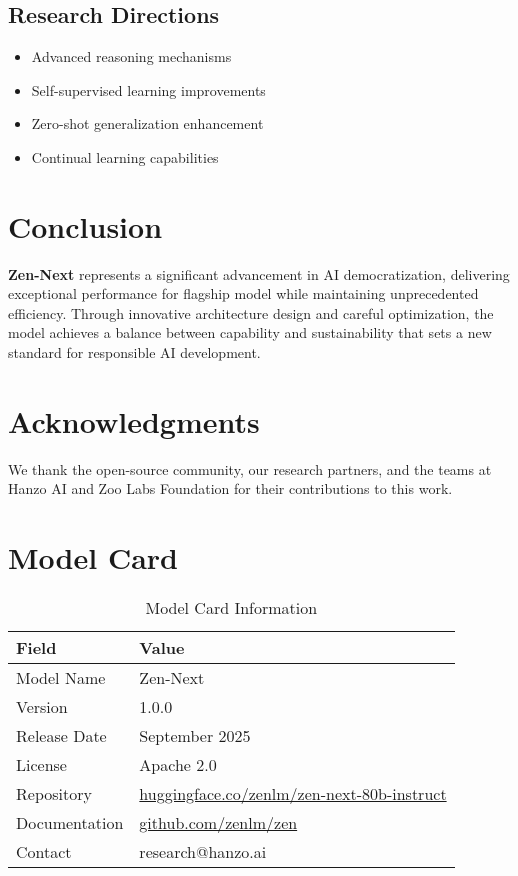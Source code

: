 \documentclass[11pt,a4paper]{article}
\begin{document}
\subsection{Research Directions}
\begin{itemize}
    \item Advanced reasoning mechanisms
    \item Self-supervised learning improvements
    \item Zero-shot generalization enhancement
    \item Continual learning capabilities
\end{itemize}

\section{Conclusion}

\textbf{Zen-Next} represents a significant advancement in AI democratization, 
delivering exceptional performance for flagship model while maintaining 
unprecedented efficiency. Through innovative architecture design and careful optimization, 
the model achieves a balance between capability and sustainability that sets a new standard 
for responsible AI development.

\section*{Acknowledgments}

We thank the open-source community, our research partners, and the teams at Hanzo AI and 
Zoo Labs Foundation for their contributions to this work.




\appendix

\section{Model Card}

\begin{table}[H]
\centering
\begin{tabular}{ll}
\toprule
\textbf{Field} & \textbf{Value} \\
\midrule
Model Name & Zen-Next \\
Version & 1.0.0 \\
Release Date & September 2025 \\
License & Apache 2.0 \\
Repository & \href{https://huggingface.co/zenlm/zen-next-80b-instruct}{huggingface.co/zenlm/zen-next-80b-instruct} \\
Documentation & \href{https://github.com/zenlm/zen}{github.com/zenlm/zen} \\
Contact & research@hanzo.ai \\
\bottomrule
\end{tabular}
\caption{Model Card Information}
\end{table}
\end{document}
